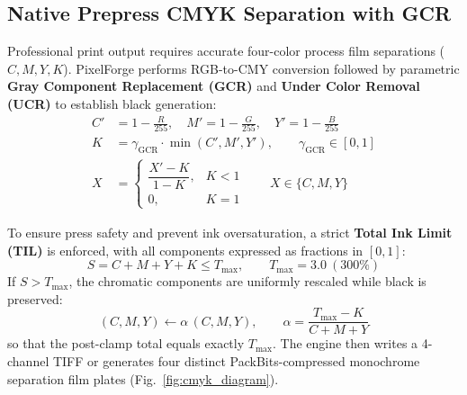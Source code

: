 \documentclass[10pt,journal,compsoc]{IEEEtran}
\begin{document}
\subsection{Native Prepress CMYK Separation with GCR}
Professional print output requires accurate four-color process film separations ($C, M, Y, K$). PixelForge performs RGB-to-CMY conversion followed by parametric \textbf{Gray Component Replacement (GCR)} and \textbf{Under Color Removal (UCR)} to establish black generation:
\begin{align}
C' &= 1 - \tfrac{R}{255}, \quad M' = 1 - \tfrac{G}{255}, \quad Y' = 1 - \tfrac{B}{255} \\
K &= \gamma_{\text{GCR}} \cdot \min(C', M', Y'), \qquad \gamma_{\text{GCR}} \in [0, 1] \\
X &= \begin{cases} \dfrac{X' - K}{1 - K}, & K < 1 \\[4pt] 0, & K = 1 \end{cases} \qquad X \in \{C, M, Y\}
\end{align}

To ensure press safety and prevent ink oversaturation, a strict \textbf{Total Ink Limit (TIL)} is enforced, with all components expressed as fractions in $[0, 1]$:
\begin{equation}
S = C + M + Y + K \le T_{\max}, \qquad T_{\max} = 3.0 \ (300\%)
\end{equation}
If $S > T_{\max}$, the chromatic components are uniformly rescaled while black is preserved:
\begin{equation}
(C, M, Y) \leftarrow \alpha\,(C, M, Y), \qquad \alpha = \frac{T_{\max} - K}{C + M + Y}
\end{equation}
so that the post-clamp total equals exactly $T_{\max}$. The engine then writes a 4-channel TIFF or generates four distinct PackBits-compressed monochrome separation film plates (Fig.~\ref{fig:cmyk_diagram}).
\end{document}
